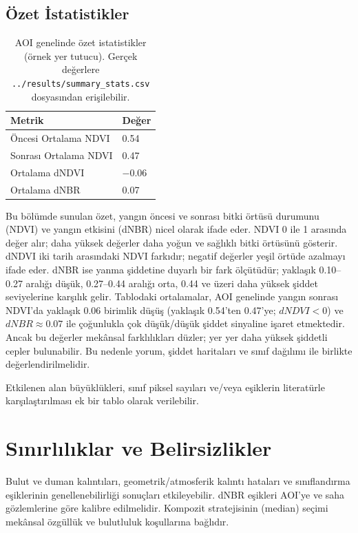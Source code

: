 \documentclass[11pt,a4paper]{article}
\begin{document}
\subsection*{Özet İstatistikler}
\begin{table}[h]
  \centering
  \begin{tabular}{@{}ll@{}}\toprule
  Metrik & Değer \\\midrule
  Öncesi Ortalama NDVI & 0.54 \\
  Sonrası Ortalama NDVI & 0.47 \\
  Ortalama dNDVI & $-0.06$ \\
  Ortalama dNBR & 0.07 \\\bottomrule
  \end{tabular}
  \caption{AOI genelinde özet istatistikler (örnek yer tutucu). Gerçek değerlere \texttt{../results/summary\_stats.csv} dosyasından erişilebilir.}
\end{table}

Bu bölümde sunulan özet, yangın öncesi ve sonrası bitki örtüsü durumunu (NDVI) ve yangın etkisini (dNBR) nicel olarak ifade eder. NDVI 0 ile 1 arasında değer alır; daha yüksek değerler daha yoğun ve sağlıklı bitki örtüsünü gösterir. dNDVI iki tarih arasındaki NDVI farkıdır; negatif değerler yeşil örtüde azalmayı ifade eder. dNBR ise yanma şiddetine duyarlı bir fark ölçütüdür; yaklaşık 0.10--0.27 aralığı düşük, 0.27--0.44 aralığı orta, 0.44 ve üzeri daha yüksek şiddet seviyelerine karşılık gelir. Tablodaki ortalamalar, AOI genelinde yangın sonrası NDVI’da yaklaşık 0.06 birimlik düşüş (yaklaşık 0.54'ten 0.47'ye; \(dNDVI<0\)) ve \(dNBR \approx 0.07\) ile çoğunlukla çok düşük/düşük şiddet sinyaline işaret etmektedir. Ancak bu değerler mekânsal farklılıkları düzler; yer yer daha yüksek şiddetli cepler bulunabilir. Bu nedenle yorum, şiddet haritaları ve sınıf dağılımı ile birlikte değerlendirilmelidir.

Etkilenen alan büyüklükleri, sınıf piksel sayıları ve/veya eşiklerin literatürle
karşılaştırılması ek bir tablo olarak verilebilir.

\section{Sınırlılıklar ve Belirsizlikler}
Bulut ve duman kalıntıları, geometrik/atmosferik kalıntı hataları ve sınıflandırma
eşiklerinin genellenebilirliği sonuçları etkileyebilir. dNBR eşikleri AOI'ye ve saha
gözlemlerine göre kalibre edilmelidir. Kompozit stratejisinin (median) seçimi mekânsal
özgüllük ve bulutluluk koşullarına bağlıdır.
\end{document}
